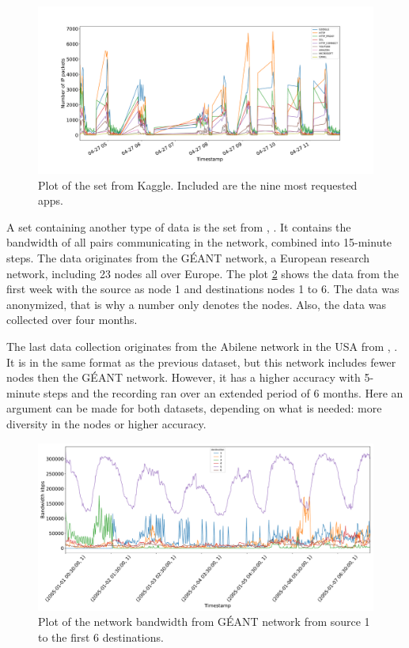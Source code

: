 \begin{figure}
	\centering
	\includegraphics[width=1\linewidth]{Pictures/Dataset/KaggleSetPlotTop9Apps}
	\caption{Plot of the set from Kaggle. Included are the nine most requested apps.}
	\label{fig:kagglesetplottop9apps}
\end{figure}

A set containing another type of data is the set from \cite{SNDlib10}, \cite{OrlowskiPioroTomaszewskiWessaely2010}.
It contains the bandwidth of all pairs communicating in the network, combined into 15-minute steps.
The data originates from the GÉANT network, a European research network, including 23 nodes all over Europe.
The plot \ref{fig:totemplotfirstweek6destinationsfrom1} shows the data from the first week with the source as node 1 and destinations nodes 1 to 6.
The data was anonymized, that is why a number only denotes the nodes.
Also, the data was collected over four months.

The last data collection originates from the Abilene network in the USA from \cite{SNDlib10}, \cite{OrlowskiPioroTomaszewskiWessaely2010}.
It is in the same format as the previous dataset, but this network includes fewer nodes then the GÉANT network.
However, it has a higher accuracy with 5-minute steps and the recording ran over an extended period of 6 months.
Here an argument can be made for both datasets, depending on what is needed: more diversity in the nodes or higher accuracy.

\begin{figure}
	\centering
	\includegraphics[width=1\linewidth]{Pictures/Dataset/TOTEMPlotFirstWeek6DestinationsFrom1}
	\caption{Plot of the network bandwidth from GÉANT network from source 1 to the first 6 destinations.}
	\label{fig:totemplotfirstweek6destinationsfrom1}
\end{figure}

